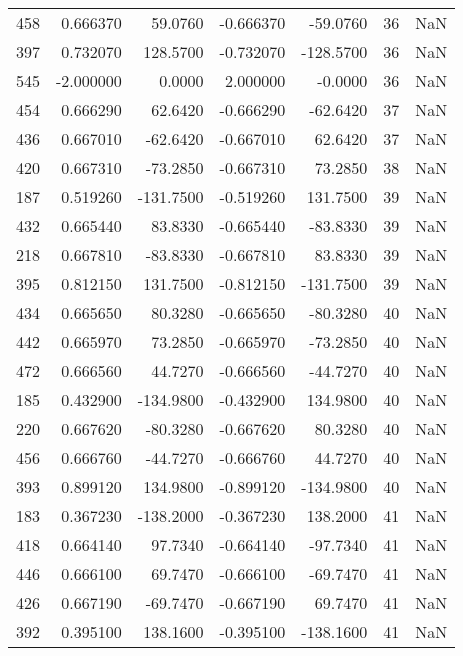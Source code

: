 \begin{tabular}{rrrrrrr}
 458 &    0.666370 &   59.0760 &   -0.666370 &    -59.0760 &          36 & NaN \\
 397 &    0.732070 &  128.5700 &   -0.732070 &   -128.5700 &          36 & NaN \\
 545 &   -2.000000 &    0.0000 &    2.000000 &     -0.0000 &          36 & NaN \\
 454 &    0.666290 &   62.6420 &   -0.666290 &    -62.6420 &          37 & NaN \\
 436 &    0.667010 &  -62.6420 &   -0.667010 &     62.6420 &          37 & NaN \\
 420 &    0.667310 &  -73.2850 &   -0.667310 &     73.2850 &          38 & NaN \\
 187 &    0.519260 & -131.7500 &   -0.519260 &    131.7500 &          39 & NaN \\
 432 &    0.665440 &   83.8330 &   -0.665440 &    -83.8330 &          39 & NaN \\
 218 &    0.667810 &  -83.8330 &   -0.667810 &     83.8330 &          39 & NaN \\
 395 &    0.812150 &  131.7500 &   -0.812150 &   -131.7500 &          39 & NaN \\
 434 &    0.665650 &   80.3280 &   -0.665650 &    -80.3280 &          40 & NaN \\
 442 &    0.665970 &   73.2850 &   -0.665970 &    -73.2850 &          40 & NaN \\
 472 &    0.666560 &   44.7270 &   -0.666560 &    -44.7270 &          40 & NaN \\
 185 &    0.432900 & -134.9800 &   -0.432900 &    134.9800 &          40 & NaN \\
 220 &    0.667620 &  -80.3280 &   -0.667620 &     80.3280 &          40 & NaN \\
 456 &    0.666760 &  -44.7270 &   -0.666760 &     44.7270 &          40 & NaN \\
 393 &    0.899120 &  134.9800 &   -0.899120 &   -134.9800 &          40 & NaN \\
 183 &    0.367230 & -138.2000 &   -0.367230 &    138.2000 &          41 & NaN \\
 418 &    0.664140 &   97.7340 &   -0.664140 &    -97.7340 &          41 & NaN \\
 446 &    0.666100 &   69.7470 &   -0.666100 &    -69.7470 &          41 & NaN \\
 426 &    0.667190 &  -69.7470 &   -0.667190 &     69.7470 &          41 & NaN \\
 392 &    0.395100 &  138.1600 &   -0.395100 &   -138.1600 &          41 & NaN \\

\end{tabular}
